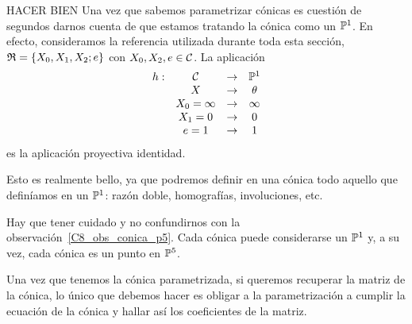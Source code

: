 \begin{obs} HACER BIEN
	Una vez que sabemos parametrizar cónicas es cuestión de segundos darnos cuenta de que estamos tratando la cónica como un $\mathbb{P}^1$. En efecto, consideramos la referencia utilizada durante toda esta sección, $\mathfrak{R}=\{X_0,X_1,X_2;e\}$ con $X_0,X_2,e\in \mathcal{C}$. La aplicación
	\[\begin{array}{cccc}
		h:& \mathcal{C}&\rightarrow &\mathbb{P}^1\\
		&X&\rightarrow &\theta\\
		&X_0=\infty&\rightarrow &\infty\\
		&X_1=0&\rightarrow &0\\
		&e=1&\rightarrow &1\\
	\end{array}\]
	es la aplicación proyectiva identidad.
	
	Esto es realmente bello, ya que podremos definir en una cónica todo aquello que definíamos en un $\mathbb{P}^1$: razón doble, homografías, involuciones, etc.
	
	Hay que tener cuidado y no confundirnos con la observación~\ref{C8_obs_conica_p5}. Cada cónica puede considerarse un $\mathbb{P}^1$ y, a su vez, cada cónica es un punto en $\mathbb{P}^5$.
\end{obs}
\begin{obs}
	Una vez que tenemos la cónica parametrizada, si queremos recuperar la matriz de la cónica, lo único que debemos hacer es obligar a la parametrización a cumplir la ecuación de la cónica y hallar así los coeficientes de la matriz.
\end{obs}

